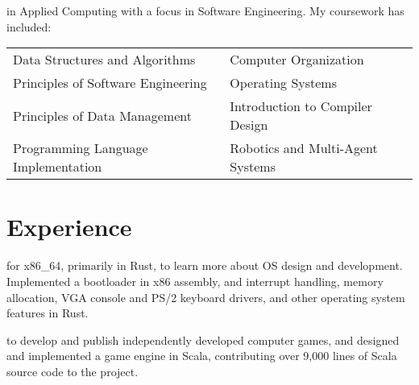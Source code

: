 \documentclass[a4paper]{tufte-handout}
\begin{document}
 in Applied Computing with a focus in Software Engineering. My coursework has included: \\
    {\footnotesize
    \begin{tabular}{l l}
    Data Structures and Algorithms  & Computer Organization \\
    Principles of Software Engineering & Operating Systems\\
    Principles of Data Management & Introduction to Compiler Design\\
    Programming Language Implementation & Robotics and Multi-Agent Systems\\
\end{tabular} }

\section{Experience}
 for x86\_64, primarily in Rust, to learn more about OS design and development. Implemented a bootloader in x86 assembly, and interrupt handling, memory allocation, VGA console and PS/2 keyboard drivers, and other operating system features in Rust.

 to develop and publish independently developed computer games, and designed and implemented a game engine in Scala, contributing over 9,000 lines of Scala source code to the project.
\end{document}
